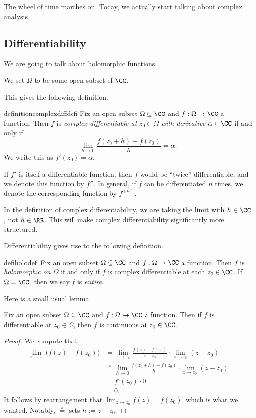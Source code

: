 
The wheel of time marches on. Today, we actually start talking about complex analysis.

\subsection{Differentiability}
We are going to talk about holomorphic functions.
\begin{convention}
	We set $\Omega$ to be some open subset of $\CC$.
\end{convention}
This gives the following definition.
\begin{restatable}[Differentiable]{definition}{complexdiffdefi}
	Fix an open subset $\Omega\subseteq\CC$ and $f:\Omega\to\CC$ a function. Then $f$ is \textit{complex differentiable at} $z_0\in\Omega$ \textit{with derivative} $\alpha\in\CC$ if and only if
	\[\lim_{h\to0}\frac{f(z_0+h)-f(z_0)}h=\alpha.\]
	We write this as $f'(z_0)=\alpha$.
\end{restatable}
\noindent If $f'$ is itself a differentiable function, then $f$ would be ``twice'' differentiable, and we denote this function by $f''$. In general, if $f$ can be differentiated $n$ times, we denote the corresponding function by $f^{(n)}$.
\begin{warn}
	In the definition of complex differentiability, we are taking the limit with $h\in\CC$, not $h\in\RR$. This will make complex differentiability significantly more structured.
\end{warn}
Differentiability gives rise to the following definition.
\begin{restatable}{defi}{holodefi}
	Fix an open subset $\Omega\subseteq\CC$ and $f:\Omega\to\CC$ a function. Then $f$ is \textit{holomorphic on $\Omega$} if and only if $f$ is complex differentiable at each $z_0\in\CC$. If $\Omega=\CC$, then we say $f$ is \textit{entire}.
\end{restatable}
Here is a small usual lemma.
\begin{lemma}
	Fix an open subset $\Omega\subseteq\CC$ and $f:\Omega\to\CC$ a function. Then if $f$ is differentiable at $z_0\in\Omega$, then $f$ is continuous at $z_0\in\CC$.
\end{lemma}
\begin{proof}
	We compute that
	\begin{align*}
		\lim_{z\to z_0}\big(f(z)-f(z_0)\big) &= \lim_{z\to z_0}\frac{f(z)-f(z_0)}{z-z_0}\cdot\lim_{z\to z_0}(z-z_0) \\
		&\stackrel*= \lim_{h\to0}\frac{f(z_0+h)-f(z_0)}h\cdot\lim_{z\to z_0}(z-z_0) \\
		&= f'(z_0)\cdot0 \\
		&= 0.
	\end{align*}
	It follows by rearrangement that $\lim_{z\to z_0}f(z)=f(z_0)$, which is what we wanted. Notably, $\stackrel*=$ sets $h:=z-z_0$.
\end{proof}

